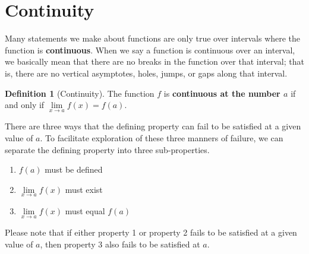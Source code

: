 \documentclass[12pt,]{book}
\newcommand{\terminology}[1]{\textbf{#1}}
\theoremstyle{plain}
\theoremstyle{definition}
\newtheorem{definition}[theorem]{Definition}
\numberwithin{equation}{section}
\newcommand{\fe}[2]{#1\mathopen{}\left(#2\right)\mathclose{}}
\begin{document}
\section[Continuity]{Continuity}\label{section-continuity}
Many statements we make about functions are only true over intervals where the function is \terminology{continuous}. When we say a function is continuous over an interval, we basically mean that there are no breaks in the function over that interval; that is, there are no vertical asymptotes, holes, jumps, or gaps along that interval.%
\begin{definition}[Continuity]\label{definition-continuity}
The function \(f\) is \terminology{continuous at the number \(a\)} if and only if \(\lim\limits_{x\to a}\fe{f}{x}=\fe{f}{a}\).%
\par
There are three ways that the defining property can fail to be satisfied at a given value of \(a\). To facilitate exploration of these three manners of failure, we can separate the defining property into three sub-properties.%
\begin{enumerate}
\item{}\(\fe{f}{a}\) must be defined\item{}\(\lim\limits_{x\to a}\fe{f}{x}\) must exist\item{}\(\lim\limits_{x\to a}\fe{f}{x}\) must equal \(\fe{f}{a}\)\end{enumerate}
\par
Please note that if either property 1 or property 2 fails to be satisfied at a given value of \(a\), then property 3 also fails to be satisfied at \(a\).%
\end{definition}
\typeout{************************************************}
\typeout{************************************************}
\end{document}
